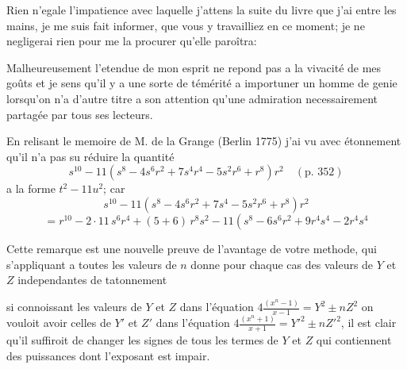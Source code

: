 \documentclass[11pt,a4paper]{article}
\begin{document}

Rien n'egale l'impatience avec laquelle j'attens la suite du livre que j'ai
entre les mains, je me suis fait informer, que vous y travailliez en ce
moment; \struck{\ill{}} je ne negligerai rien pour me la procurer
 qu'elle paroîtra:


Malheureusement  l'etendue de mon esprit ne
repond  pas a la vivacité de mes goûts et je sens qu'il y a une
sorte de  témérité a \struck{\ill{}} importuner un homme de genie
lorsqu'on n'a d'autre titre a son attention qu'une admiration necessairement
partagée par tous ses lecteurs.


En relisant le memoire de M. de la Grange (Berlin 1775) j'ai vu avec
étonnement qu'il n'a pas su réduire la quantité
\[
s^{10} - 11\left(s^8 - 4 s^6 r^2 + 7 s^4 r^4 - 5 s^2 r^6 + r^8\right) r^2
\quad (\text{p. } 352)
\]
a la forme $t^2 - 11 u^2$; car
\[
s^{10} - 11\left(s^8 - 4 s^6 r^2 + 7 s^4 - 5 s^2 r^6 + r^8\right) r^2
\]
\[
= r^{10} - 2 \cdot 11\, s^6 r^4 + (5 + 6)\, r^8 s^2
- 11\left(s^8 - 6 s^6 r^2 + 9 r^4 s^4 - 2 r^4 s^4\right.
\]


Cette remarque est une nouvelle preuve de l'avantage de votre methode, qui
s'appliquant a toutes les  valeurs de $n$ donne pour chaque cas
des valeurs de $Y$ et $Z$ independantes de tatonnement

si connoissant les valeurs de $Y$ et $Z$ dans l'équation
$4\frac{(x^n - 1)}{x - 1} = Y^2 \pm n Z^2$ on vouloit avoir celles de $Y'$
et $Z'$ dans l'équation $4\frac{(x^n + 1)}{x + 1} = Y'^2 \pm n Z'^2$, il est
clair qu'il suffiroit de changer les signes de tous les termes de $Y$ et $Z$
qui contiennent des puissances  dont l'exposant est impair.
\end{document}
